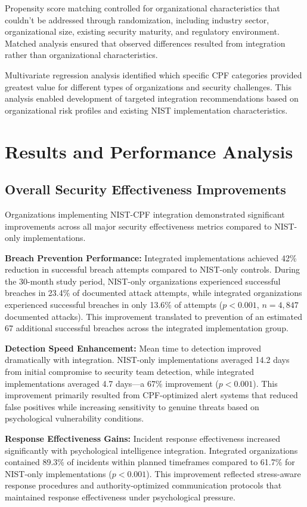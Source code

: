\documentclass[10pt, twocolumn]{article}
\begin{document}
Propensity score matching controlled for organizational characteristics that couldn't be addressed through randomization, including industry sector, organizational size, existing security maturity, and regulatory environment. Matched analysis ensured that observed differences resulted from integration rather than organizational characteristics.

Multivariate regression analysis identified which specific CPF categories provided greatest value for different types of organizations and security challenges. This analysis enabled development of targeted integration recommendations based on organizational risk profiles and existing NIST implementation characteristics.

\section{Results and Performance Analysis}

\subsection{Overall Security Effectiveness Improvements}

Organizations implementing NIST-CPF integration demonstrated significant improvements across all major security effectiveness metrics compared to NIST-only implementations.

\textbf{Breach Prevention Performance:} Integrated implementations achieved 42\% reduction in successful breach attempts compared to NIST-only controls. During the 30-month study period, NIST-only organizations experienced successful breaches in 23.4\% of documented attack attempts, while integrated organizations experienced successful breaches in only 13.6\% of attempts ($p < 0.001$, $n = 4,847$ documented attacks). This improvement translated to prevention of an estimated 67 additional successful breaches across the integrated implementation group.

\textbf{Detection Speed Enhancement:} Mean time to detection improved dramatically with integration. NIST-only implementations averaged 14.2 days from initial compromise to security team detection, while integrated implementations averaged 4.7 days—a 67\% improvement ($p < 0.001$). This improvement primarily resulted from CPF-optimized alert systems that reduced false positives while increasing sensitivity to genuine threats based on psychological vulnerability conditions.

\textbf{Response Effectiveness Gains:} Incident response effectiveness increased significantly with psychological intelligence integration. Integrated organizations contained 89.3\% of incidents within planned timeframes compared to 61.7\% for NIST-only implementations ($p < 0.001$). This improvement reflected stress-aware response procedures and authority-optimized communication protocols that maintained response effectiveness under psychological pressure.
\end{document}
